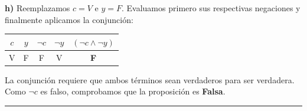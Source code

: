 \vspace{0.4cm}
\textbf{h)} Reemplazamos $c=V$ e $y=F$. Evaluamos primero sus respectivas negaciones y finalmente aplicamos la conjunción:

\begin{center}
\begin{tabular}{|c|c|c|c|c|}
\hline
$c$ & $y$ & $\neg c$ & $\neg y$ & $(\neg c \wedge \neg y)$ \\
\hline
V & F & F & V & \textbf{F} \\
\hline
\end{tabular}
\end{center}

La conjunción requiere que ambos términos sean verdaderos para ser verdadera. Como $\neg c$ es falso, comprobamos que la proposición es \textbf{Falsa}.

\vspace{0.5cm}
\hrule
\vspace{0.5cm}